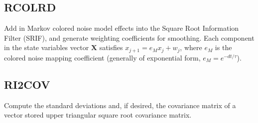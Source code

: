 \documentclass[./doc.tex]{subfiles}
\begin{document}
\subsection{RCOLRD}
Add in Markov colored noise model effects into the Square Root Information Filter (SRIF), and generate weighting
coefficients for smoothing. Each component in the state variables vector \(\bm{X}\) satisfies
\(x_{j+1} = e_M x_j + w_j\), where \(e_M\) is the colored noise mapping coefficient (generally of exponential
form, \(e_M = e^{-dt/\tau}\)).

\subsection{RI2COV}
Compute the standard deviations and, if desired, the covariance matrix of a vector stored upper triangular
square root covariance matrix.
\end{document}
